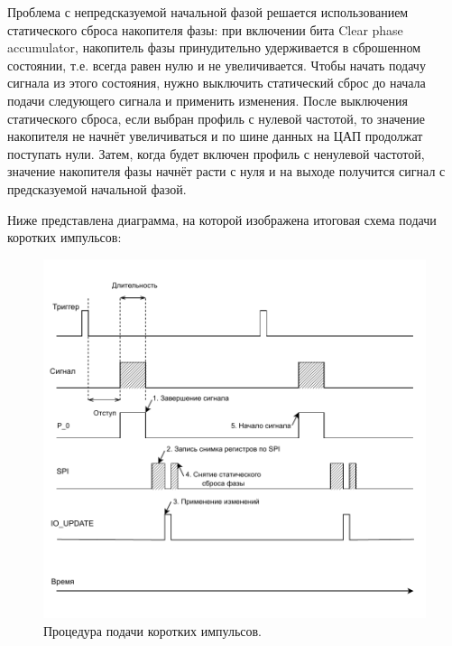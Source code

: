 \documentclass[rusmathsym, eqnumwithinsec, amspack, hyperref]{bomgost}
\begin{document}
Проблема с непредсказуемой начальной фазой решается использованием статического сброса накопителя фазы: при включении бита Clear phase accumulator, накопитель фазы принудительно удерживается в сброшенном состоянии, т.е. всегда равен нулю и не увеличивается. Чтобы начать подачу сигнала из этого состояния, нужно выключить статический сброс до начала подачи следующего сигнала и применить изменения. После выключения статического сброса, если выбран профиль с нулевой частотой, то значение накопителя не начнёт увеличиваться и по шине данных на ЦАП продолжат поступать нули. Затем, когда будет включен профиль с ненулевой частотой, значение накопителя фазы начнёт расти с нуля и на выходе получится сигнал с предсказуемой начальной фазой.

Ниже представлена диаграмма, на которой изображена итоговая схема подачи коротких импульсов:

%
%
\begin{gostfigure}
\begin{figure}[H]
\centering
\includegraphics{data/detailed_timing_diagram.drawio.pdf}
\caption{Процедура подачи коротких импульсов.}
\label{fig:detailed_timing_diagram}
\end{figure}
\end{gostfigure}
\end{document}
